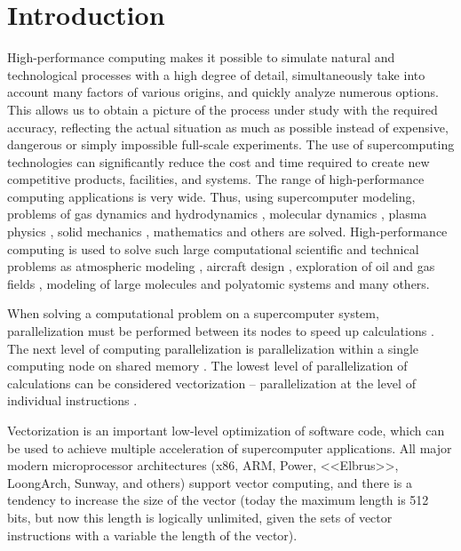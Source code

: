 \documentclass[
11pt,%
tightenlines,%
twoside,%
onecolumn,%
nofloats,%
nobibnotes,%
nofootinbib,%
superscriptaddress,%
noshowpacs,%
centertags]%
{revtex4}
\begin{document}


\maketitle


\section{Introduction}

High-performance computing makes it possible to simulate natural and technological processes with a high degree of detail, simultaneously take into account many factors of various origins, and quickly analyze numerous options.
This allows us to obtain a picture of the process under study with the required accuracy, reflecting the actual situation as much as possible instead of expensive, dangerous or simply impossible full-scale experiments.
The use of supercomputing technologies can significantly reduce the cost and time required to create new competitive products, facilities, and systems.
The range of high-performance computing applications is very wide.
Thus, using supercomputer modeling, problems of gas dynamics and hydrodynamics \cite{01Smirnov}, molecular dynamics \cite{02Guo}, plasma physics \cite{03Asch}, solid mechanics \cite{04Morgan}, mathematics \cite{05Lohiya} and others are solved.
High-performance computing is used to solve such large computational scientific and technical problems as atmospheric modeling \cite{06Kang}, aircraft design \cite{07Morad}, exploration of oil and gas fields \cite{08Eremin}, modeling of large molecules and polyatomic systems \cite{09Yan} and many others.

When solving a computational problem on a supercomputer system, parallelization must be performed between its nodes to speed up calculations \cite{10Voevodin}.
The next level of computing parallelization is parallelization within a single computing node on shared memory \cite{11Zhou}.
The lowest level of parallelization of calculations can be considered vectorization – parallelization at the level of individual instructions \cite{12Feng}.

Vectorization is an important low-level optimization of software code, which can be used to achieve multiple acceleration of supercomputer applications.
All major modern microprocessor architectures (x86, ARM, Power, <<Elbrus>>, LoongArch, Sunway, and others) support vector computing, and there is a tendency to increase the size of the vector (today the maximum length is 512 bits, but now this length is logically unlimited, given the sets of vector instructions with a variable the length
of the vector).
\end{document}

